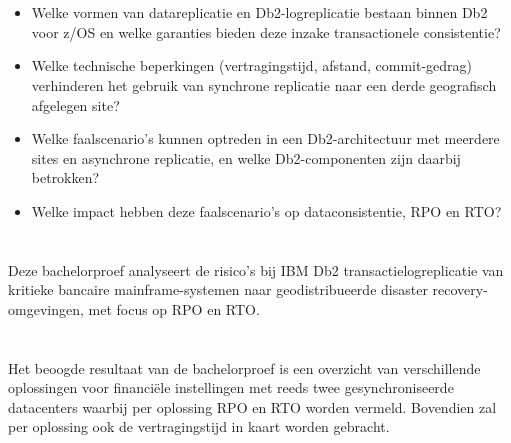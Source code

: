 \section{}%
\label{sec:deelvragen-probleemdomein}
\begin{itemize}
    \item Welke vormen van datareplicatie en Db2-logreplicatie bestaan binnen Db2 voor z/OS en welke garanties bieden deze inzake transactionele consistentie?
    \item Welke technische beperkingen (vertragingstijd, afstand, commit-gedrag) verhinderen het gebruik van synchrone replicatie naar een derde geografisch afgelegen site?
    \item Welke faalscenario's kunnen optreden in een Db2-architectuur met meerdere sites en asynchrone replicatie, en welke Db2-componenten zijn daarbij betrokken?
    \item Welke impact hebben deze faalscenario's op dataconsistentie, RPO en RTO\@?
\end{itemize}

\section{}%
\label{sec:onderzoeksvraag}

Deze bachelorproef analyseert de risico's bij IBM Db2 transactielogreplicatie van kritieke bancaire mainframe-systemen naar geodistribueerde disaster recovery-omgevingen, met focus op RPO en RTO\@.

\section{}%
\label{sec:onderzoeksdoelstelling}

Het beoogde resultaat van de bachelorproef is een overzicht van verschillende oplossingen voor financiële instellingen met reeds twee gesynchroniseerde datacenters waarbij per oplossing RPO en RTO worden vermeld.
Bovendien zal per oplossing ook de vertragingstijd in kaart worden gebracht.

\section{}%
\label{sec:opzet-bachelorproef}

